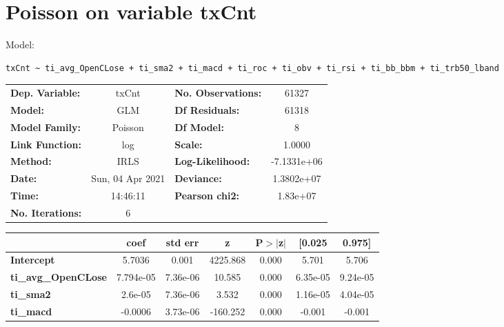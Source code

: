 \section{Poisson on variable txCnt}

Model: \begin{verbatim}txCnt ~ ti_avg_OpenCLose + ti_sma2 + ti_macd + ti_roc + ti_obv + ti_rsi + ti_bb_bbm + ti_trb50_lband\end{verbatim}

\begin{center}
\begin{tabular}{lclc}
\toprule
\textbf{Dep. Variable:}     &      txCnt       & \textbf{  No. Observations:  } &     61327    \\
\textbf{Model:}             &       GLM        & \textbf{  Df Residuals:      } &     61318    \\
\textbf{Model Family:}      &     Poisson      & \textbf{  Df Model:          } &         8    \\
\textbf{Link Function:}     &       log        & \textbf{  Scale:             } &     1.0000   \\
\textbf{Method:}            &       IRLS       & \textbf{  Log-Likelihood:    } & -7.1331e+06  \\
\textbf{Date:}              & Sun, 04 Apr 2021 & \textbf{  Deviance:          } &  1.3802e+07  \\
\textbf{Time:}              &     14:46:11     & \textbf{  Pearson chi2:      } &   1.83e+07   \\
\textbf{No. Iterations:}    &        6         & \textbf{                     } &              \\
\bottomrule
\end{tabular}
\begin{tabular}{lcccccc}
                            & \textbf{coef} & \textbf{std err} & \textbf{z} & \textbf{P$> |$z$|$} & \textbf{[0.025} & \textbf{0.975]}  \\
\midrule
\textbf{Intercept}          &       5.7036  &        0.001     &  4225.868  &         0.000        &        5.701    &        5.706     \\
\textbf{ti\_avg\_OpenCLose} &    7.794e-05  &     7.36e-06     &    10.585  &         0.000        &     6.35e-05    &     9.24e-05     \\
\textbf{ti\_sma2}           &      2.6e-05  &     7.36e-06     &     3.532  &         0.000        &     1.16e-05    &     4.04e-05     \\
\textbf{ti\_macd}           &      -0.0006  &     3.73e-06     &  -160.252  &         0.000        &       -0.001    &       -0.001     \\

\end{tabular}
\end{center}
